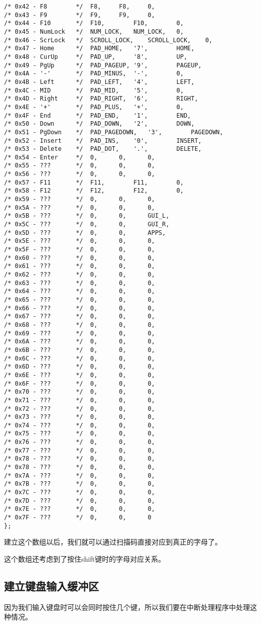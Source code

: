 \documentclass[a4paper,left=2.5cm,right=2.5cm,11pt]{article}
\begin{document}
\begin{lstlisting}
/* 0x42 - F8		*/	F8,		F8,		0,
/* 0x43 - F9		*/	F9,		F9,		0,
/* 0x44 - F10		*/	F10,		F10,		0,
/* 0x45 - NumLock	*/	NUM_LOCK,	NUM_LOCK,	0,
/* 0x46 - ScrLock	*/	SCROLL_LOCK,	SCROLL_LOCK,	0,
/* 0x47 - Home		*/	PAD_HOME,	'7',		HOME,
/* 0x48 - CurUp		*/	PAD_UP,		'8',		UP,
/* 0x49 - PgUp		*/	PAD_PAGEUP,	'9',		PAGEUP,
/* 0x4A - '-'		*/	PAD_MINUS,	'-',		0,
/* 0x4B - Left		*/	PAD_LEFT,	'4',		LEFT,
/* 0x4C - MID		*/	PAD_MID,	'5',		0,
/* 0x4D - Right		*/	PAD_RIGHT,	'6',		RIGHT,
/* 0x4E - '+'		*/	PAD_PLUS,	'+',		0,
/* 0x4F - End		*/	PAD_END,	'1',		END,
/* 0x50 - Down		*/	PAD_DOWN,	'2',		DOWN,
/* 0x51 - PgDown	*/	PAD_PAGEDOWN,	'3',		PAGEDOWN,
/* 0x52 - Insert	*/	PAD_INS,	'0',		INSERT,
/* 0x53 - Delete	*/	PAD_DOT,	'.',		DELETE,
/* 0x54 - Enter		*/	0,		0,		0,
/* 0x55 - ???		*/	0,		0,		0,
/* 0x56 - ???		*/	0,		0,		0,
/* 0x57 - F11		*/	F11,		F11,		0,	
/* 0x58 - F12		*/	F12,		F12,		0,	
/* 0x59 - ???		*/	0,		0,		0,	
/* 0x5A - ???		*/	0,		0,		0,	
/* 0x5B - ???		*/	0,		0,		GUI_L,	
/* 0x5C - ???		*/	0,		0,		GUI_R,	
/* 0x5D - ???		*/	0,		0,		APPS,	
/* 0x5E - ???		*/	0,		0,		0,	
/* 0x5F - ???		*/	0,		0,		0,
/* 0x60 - ???		*/	0,		0,		0,
/* 0x61 - ???		*/	0,		0,		0,	
/* 0x62 - ???		*/	0,		0,		0,	
/* 0x63 - ???		*/	0,		0,		0,	
/* 0x64 - ???		*/	0,		0,		0,	
/* 0x65 - ???		*/	0,		0,		0,	
/* 0x66 - ???		*/	0,		0,		0,	
/* 0x67 - ???		*/	0,		0,		0,	
/* 0x68 - ???		*/	0,		0,		0,	
/* 0x69 - ???		*/	0,		0,		0,	
/* 0x6A - ???		*/	0,		0,		0,	
/* 0x6B - ???		*/	0,		0,		0,	
/* 0x6C - ???		*/	0,		0,		0,	
/* 0x6D - ???		*/	0,		0,		0,	
/* 0x6E - ???		*/	0,		0,		0,	
/* 0x6F - ???		*/	0,		0,		0,	
/* 0x70 - ???		*/	0,		0,		0,	
/* 0x71 - ???		*/	0,		0,		0,	
/* 0x72 - ???		*/	0,		0,		0,	
/* 0x73 - ???		*/	0,		0,		0,	
/* 0x74 - ???		*/	0,		0,		0,	
/* 0x75 - ???		*/	0,		0,		0,	
/* 0x76 - ???		*/	0,		0,		0,	
/* 0x77 - ???		*/	0,		0,		0,	
/* 0x78 - ???		*/	0,		0,		0,	
/* 0x78 - ???		*/	0,		0,		0,	
/* 0x7A - ???		*/	0,		0,		0,	
/* 0x7B - ???		*/	0,		0,		0,	
/* 0x7C - ???		*/	0,		0,		0,	
/* 0x7D - ???		*/	0,		0,		0,	
/* 0x7E - ???		*/	0,		0,		0,
/* 0x7F - ???		*/	0,		0,		0
};
	\end{lstlisting}

	建立这个数组以后，我们就可以通过扫描码直接对应到真正的字母了。\par

	这个数组还考虑到了按住shift键时的字母对应关系。

\subsection{建立键盘输入缓冲区}
	因为我们输入键盘时可以会同时按住几个键，所以我们要在中断处理程序中处理这种情况。\par
\end{document}
